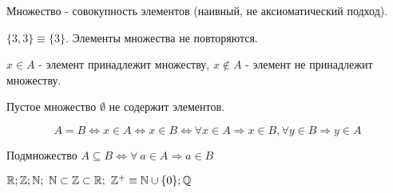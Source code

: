 \documentclass[12pt]{report}
\begin{document}
\begin{defn}
Множество - совокупность элементов (наивный, не аксиоматический подход).
\end{defn}

\begin{rem}
$\{3, 3\} \equiv \{3\}$. Элементы множества не повторяются.
\end{rem}

\begin{name}
$x \in A$ - элемент принадлежит множеству, $x \notin A$ - элемент не принадлежит множеству.
\end{name}

\begin{defn}
Пустое множество $\emptyset$ не содержит элементов.
\end{defn}

\begin{defn}
$$A = B \Longleftrightarrow x \in A \Leftrightarrow x \in B \Longleftrightarrow \forall x \in A \Rightarrow x \in B, \forall y \in B \Rightarrow y \in A$$
\end{defn}

\begin{defn}
Подмножество $A \subseteq B \Leftrightarrow \forall ~ a \in A \Rightarrow a \in B$
\end{defn}

\begin{ex}
$\mathbb{R}; \mathbb{Z}; \mathbb{N}; ~\mathbb{N} \subset \mathbb{Z} \subset \mathbb{R}; ~\mathbb{Z}^{+} \equiv \mathbb{N} \cup \{0\}; \mathbb{Q}$
\end{ex}
\end{document}
